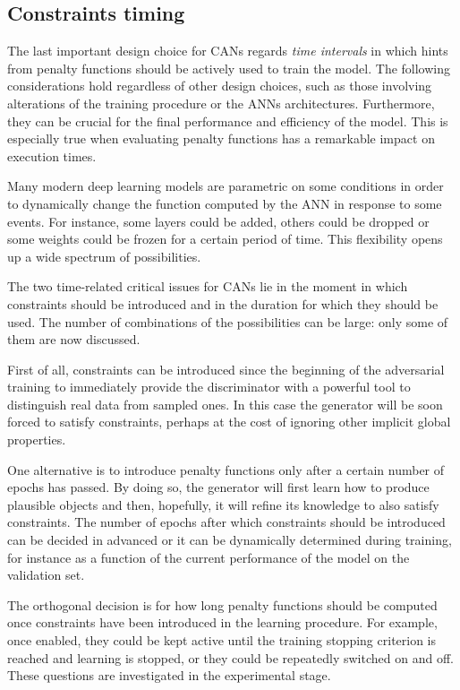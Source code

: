 \subsection{Constraints timing}
\label{subsec:constraints_timing}

The last important design choice for CANs regards \textit{time intervals} in which hints from penalty functions should be actively used to train the model. The following considerations hold regardless of other design choices, such as those involving alterations of the training procedure or the ANNs architectures. Furthermore, they can be crucial for the final performance and efficiency of the model. This is especially true when evaluating penalty functions has a remarkable impact on execution times.

Many modern deep learning models are parametric on some conditions in order to dynamically change the function computed by the ANN in response to some events. For instance, some layers could be added, others could be dropped or some weights could be frozen for a certain period of time. This flexibility opens up a wide spectrum of possibilities.

The two time-related critical issues for CANs lie in the moment in which constraints should be introduced and in the duration for which they should be used. The number of combinations of the possibilities can be large: only some of them are now discussed.

First of all, constraints can be introduced since the beginning of the adversarial training to immediately provide the discriminator with a powerful tool to distinguish real data from sampled ones. In this case the generator will be soon forced to satisfy constraints, perhaps at the cost of ignoring other implicit global properties.

One alternative is to introduce penalty functions only after a certain number of epochs has passed. By doing so, the generator will first learn how to produce plausible objects and then, hopefully, it will refine its knowledge to also satisfy constraints. The number of epochs after which constraints should be introduced can be decided in advanced or it can be dynamically determined during training, for instance as a function of the current performance of the model on the validation set.

The orthogonal decision is for how long penalty functions should be computed once constraints have been introduced in the learning procedure. For example, once enabled, they could be kept active until the training stopping criterion is reached and learning is stopped, or they could be repeatedly switched on and off. These questions are investigated in the experimental stage.


